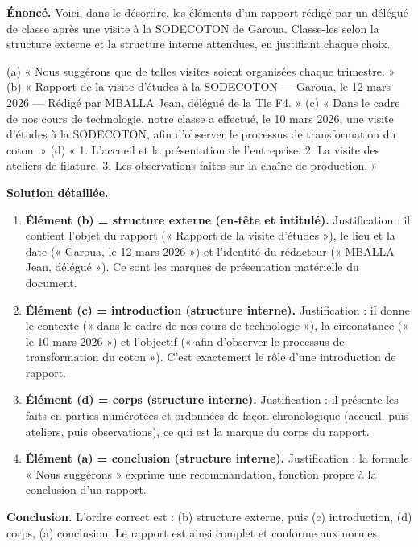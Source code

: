 \documentclass[11pt]{article}
\begin{document}
\begin{exoresolu}
\textbf{Énoncé.} Voici, dans le désordre, les éléments d'un rapport rédigé par un délégué de classe après une visite à la SODECOTON de Garoua. Classe-les selon la structure externe et la structure interne attendues, en justifiant chaque choix.

(a) « Nous suggérons que de telles visites soient organisées chaque trimestre. »
(b) « Rapport de la visite d'études à la SODECOTON — Garoua, le 12 mars 2026 — Rédigé par MBALLA Jean, délégué de la Tle F4. »
(c) « Dans le cadre de nos cours de technologie, notre classe a effectué, le 10 mars 2026, une visite d'études à la SODECOTON, afin d'observer le processus de transformation du coton. »
(d) « 1. L'accueil et la présentation de l'entreprise. 2. La visite des ateliers de filature. 3. Les observations faites sur la chaîne de production. »

\tcblower
\textbf{Solution détaillée.}
\begin{enumerate}
\item \textbf{Élément (b) = structure externe (en-tête et intitulé).} Justification : il contient l'objet du rapport (« Rapport de la visite d'études »), le lieu et la date (« Garoua, le 12 mars 2026 ») et l'identité du rédacteur (« MBALLA Jean, délégué »). Ce sont les marques de présentation matérielle du document.
\item \textbf{Élément (c) = introduction (structure interne).} Justification : il donne le contexte (« dans le cadre de nos cours de technologie »), la circonstance (« le 10 mars 2026 ») et l'objectif (« afin d'observer le processus de transformation du coton »). C'est exactement le rôle d'une introduction de rapport.
\item \textbf{Élément (d) = corps (structure interne).} Justification : il présente les faits en parties numérotées et ordonnées de façon chronologique (accueil, puis ateliers, puis observations), ce qui est la marque du corps du rapport.
\item \textbf{Élément (a) = conclusion (structure interne).} Justification : la formule « Nous suggérons » exprime une recommandation, fonction propre à la conclusion d'un rapport.
\end{enumerate}
\textbf{Conclusion.} L'ordre correct est : (b) structure externe, puis (c) introduction, (d) corps, (a) conclusion. Le rapport est ainsi complet et conforme aux normes.
\end{exoresolu}
\end{document}
